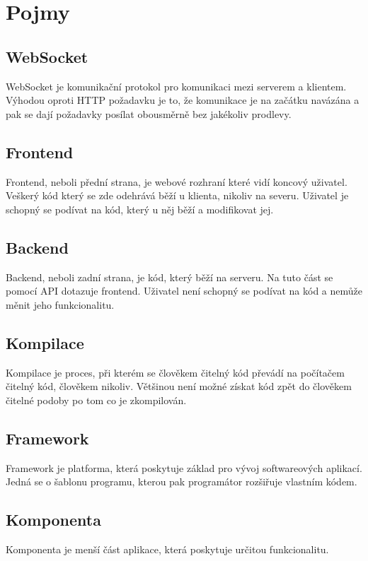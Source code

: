 \section{Pojmy}

\subsection{WebSocket}
WebSocket je komunikační protokol pro komunikaci mezi serverem a klientem. Výhodou oproti HTTP požadavku je to, že komunikace je na začátku navázána a pak se dají požadavky posílat obousměrně bez jakékoliv prodlevy.

\subsection{Frontend}
Frontend, neboli přední strana, je webové rozhraní které vidí koncový uživatel. Veškerý kód který se zde odehrává běží u klienta, nikoliv na severu. Uživatel je schopný se podívat na kód, který u něj běží a modifikovat jej.

\subsection{Backend}
Backend, neboli zadní strana, je kód, který běží na serveru. Na tuto část se pomocí API dotazuje frontend. Uživatel není schopný se podívat na kód a nemůže měnit jeho funkcionalitu.

\subsection{Kompilace}
Kompilace je proces, při kterém se člověkem čitelný kód převádí na počítačem čitelný kód, člověkem nikoliv. Většinou není možné získat kód zpět do člověkem čitelné podoby po tom co je zkompilován.

\subsection{Framework}
Framework je platforma, která poskytuje základ pro vývoj softwareových aplikací. \cite{Framework} Jedná se o šablonu programu, kterou pak programátor rozšiřuje vlastním kódem.

\subsection{Komponenta}
Komponenta je menší část aplikace, která poskytuje určitou funkcionalitu.

